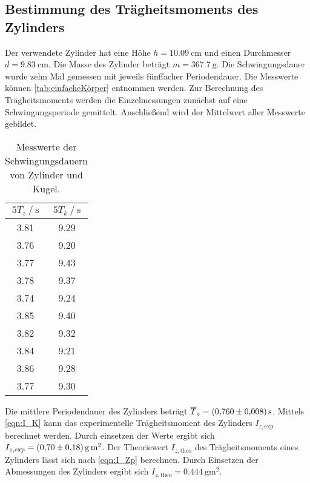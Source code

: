 \subsection{Bestimmung des Trägheitsmoments des Zylinders}
\label{subsec:A_zylinder}
Der verwendete Zylinder hat eine Höhe $h = \qty{10.09}{\centi\metre}$ und einen Durchmesser $d = \qty{9.83}{\centi\metre}$. Die Masse des Zylinder beträgt $m = \qty{367.7}{\gram}$.
Die Schwingungsdauer wurde zehn Mal gemessen mit jeweils fünffacher Periodendauer. Die Messwerte können \autoref{tab:einfacheKörper} entnommen werden. 
Zur Berechnung des Trägheitsmoments werden die Einzelmessungen zunächst auf eine Schwingungsperiode gemittelt. Anschließend wird der Mittelwert aller Messwerte gebildet.
\begin{table}
    \centering
    \caption{Messwerte der Schwingungsdauern von Zylinder und Kugel.} 
    \label{tab:einfacheKörper}
    \begin{tabular}{c c}
        \toprule
        ${5}T_{z} \mathbin{/} \unit{\second}$ & ${5}T_k \mathbin{/} \unit{\second}$ \\
        \midrule
        3.81 & 9.29 \\
        3.76 & 9.20 \\
        3.77 & 9.43 \\
        3.78 & 9.37 \\
        3.74 & 9.24 \\
        3.85 & 9.40 \\
        3.82 & 9.32 \\
        3.84 & 9.21 \\
        3.86 & 9.28 \\
        3.77 & 9.30 \\
        \bottomrule 
    \end{tabular}
\end{table}
Die mittlere Periodendauer des Zylinders beträgt $\overline{T}_z = \qty{0.760+-0.008}{\second}$.
Mittels \autoref{eqn:I_K} kann das experimentelle Trägheitsmoment des Zylinders $I_{z,\text{exp}}$ berechnet werden. Durch einsetzen der Werte ergibt sich $I_{z,\text{exp}} = \qty{0.70+-0.18}{\gram\metre\squared}$.
Der Theoriewert $I_{z,\text{theo}}$ des Trägheitsmoments eines Zylinders lässt sich nach \autoref{eqn:I_Zp} berechnen.
Durch Einsetzen der Abmessungen des Zylinders ergibt sich $I_{z,\text{theo}} = \qty{0.444}{\gram\metre\squared}$.

